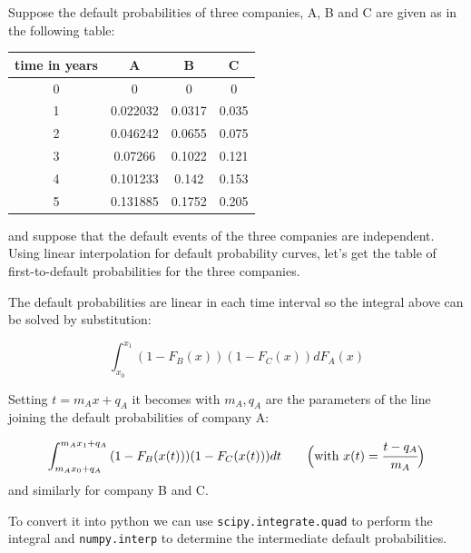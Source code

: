 Suppose the default probabilities of three companies, A, B and C are
given as in the following table:

\begin{center}
\begin{tabular}{|c|c|c|c|}
time in years & A & B & C \\
\hline
0 & 0 & 0 & 0 \\
1 & 0.022032 & 0.0317 & 0.035 \\
2 & 0.046242 & 0.0655 & 0.075 \\
3 & 0.07266 & 0.1022 & 0.121 \\
4 & 0.101233 & 0.142 & 0.153 \\
5 & 0.131885 & 0.1752 & 0.205 \\
\end{tabular}
\end{center}

and suppose that the default events of the three companies are
independent. Using linear interpolation for default probability curves,
let's get the table of first-to-default probabilities for the three
companies.

The default probabilities are linear in each time interval so the
integral above can be solved by substitution:

\[ \int_{x_0}^{x_1}{(1-F_B(x))(1-F_C(x))dF_A(x)}\]

Setting \(t=m_A x + q_A\) it becomes with \(m_A, q_A\) are the
parameters of the line joining the default probabilities of company A:

\[ \int_{m_A x_0 + q_A}^{m_A x_1 + q_A}{(1-F_B(x(t)))(1-F_C(x(t)))dt}~~~~~~\Big(\textrm{with}~x(t) = \cfrac{t -q_A}{m_A}\Big) \]
and similarly for company B and C.

To convert it into python we can use \texttt{scipy.integrate.quad} to
perform the integral and \texttt{numpy.interp} to determine the
intermediate default probabilities.

